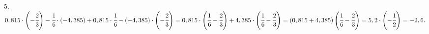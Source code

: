5. $0,815 \cdot \left (-\cfrac{2}{3}\right )-\cfrac{1}{6}\cdot(-4,385)+0,815\cdot\cfrac{1}{6}-(-4,385)\cdot\left(-\cfrac{2}{3}\right)=
0,815\cdot\left(\cfrac{1}{6}-\cfrac{2}{3}\right)+4,385\cdot\left(\cfrac{1}{6}-\cfrac{2}{3}\right)=
(0,815+4,385)\left(\cfrac{1}{6}-\cfrac{2}{3}\right)=5,2\cdot\left(-\cfrac{1}{2}\right)=-2,6.$\\
